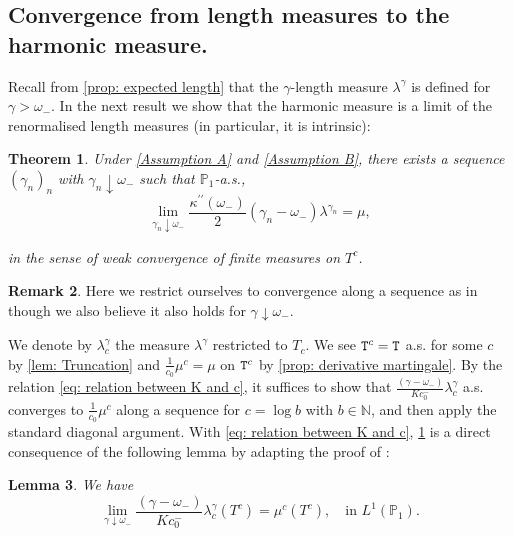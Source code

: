 \documentclass[12pt]{article}
\numberwithin{equation}{section}
\theoremstyle{plain}
\newtheorem{thm}{Theorem}[section]
\newtheorem{lem}[thm]{Lemma}
\theoremstyle{definition}
\newtheorem{rem}[thm]{Remark}
\begin{document}
\subsection{Convergence from length measures to the harmonic measure. }\label{sec: convergence between measures}

Recall from \cref{prop: expected length} that the $\gamma$-length measure $\lambda^\gamma$ is defined for $\gamma>\omega_-$. In the next result we show that the harmonic measure is a limit of the renormalised length measures (in particular, it is intrinsic):\begin{thm}\label{thm: weak convergence length measure} Under \cref{Assumption A} and \cref{Assumption B}, there exists a sequence $(\gamma_n)_n$ with $\gamma_n \downarrow\omega_-$ such that $\mathbb{P}_1$-a.s.,
\[\lim_{\gamma_n \downarrow\omega_-} \frac{\kappa^{\prime\prime}(\omega_-)}{2}(\gamma_n-\omega_-)\lambda^{\gamma_n} = \mu, \]

\noindent in the sense of weak convergence of finite measures on $T^c$.
\end{thm}





\begin{rem}
Here we restrict ourselves to convergence along a sequence as in \cite[Proposition 2.15]{BertoinJean2024SMta} though we also believe it also holds for $\gamma\downarrow\omega_- $.
\end{rem}

\noindent We denote by $\lambda^\gamma_c$ the measure $\lambda^\gamma$ restricted to $T_c$. We see ${\tt T}^c=\tt T$ a.s. for some $c$ by \cref{lem: Truncation} and $\frac{1}{c_0}\mu^c = \mu$ on ${\tt T}^c$ by \cref{prop: derivative martingale}. By the relation \eqref{eq: relation between K and c}, it suffices to show that $\frac{(\gamma - \omega_-)}{Kc_0^-}\lambda^{\gamma}_c$ a.s. converges to $\frac{1}{c_0}\mu^c$ along a sequence for $c = \log b$ with $b\in\mathbb{N}$, and then apply the standard diagonal argument. With \eqref{eq: relation between K and c}, \cref{thm: weak convergence length measure} is a direct consequence of the following lemma by adapting the  proof of  \cite[Proposition 2.15]{BertoinJean2024SMta}:

\begin{lem}\label{lem: convergence total mass}
We have
\[\lim_{\gamma\downarrow\omega_-}\frac{(\gamma-\omega_-)}{Kc_0^-}\lambda^{\gamma}_c(T^c) = \mu^c(T^c), \quad \mbox{in } L^1(\mathbb{P}_1). \]
\end{lem}
\end{document}
